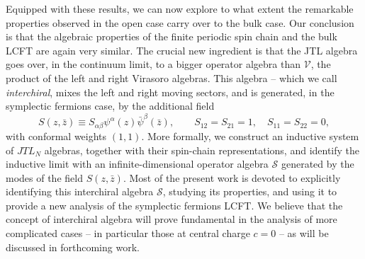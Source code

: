 \documentclass[11pt]{article}
\newcommand{\JTL}[1]{JTL_{#1}}
\newcommand{\VirN}{\boldsymbol{\mathcal{V}}}
\newcommand{\interchalg}{\mathcal{S}}
\theoremstyle{definition}
\begin{document}
Equipped with these results, we can now explore to what extent the remarkable properties observed in the open case \cite{ReadSaleur07-1} carry over to the bulk case. Our conclusion is that the algebraic properties of the finite periodic spin chain and the bulk LCFT are again very similar. The crucial new ingredient is that the JTL algebra goes over, in the continuum limit,
to a bigger operator algebra than $\VirN$, the product of the left and right Virasoro algebras. This algebra -- which we call \textit{interchiral}, mixes the left and right moving sectors, and is generated, in the symplectic fermions case, by the additional field
\begin{equation}\label{eq:interch-f}
S(z,\bar{z})\equiv S_{\alpha\beta}\psi^\alpha(z)\bar{\psi}^\beta(\bar{z}), \qquad S_{12} = S_{21}=1, \quad S_{11} = S_{22}=0,
\end{equation}
 with conformal weights $(1,1)$. More formally, we construct an inductive system of $\JTL{N}$ algebras,
together with their spin-chain representations, and identify the inductive limit with an infinite-dimensional
operator algebra $\interchalg$ generated by the modes of the field $S(z,\bar{z})$. Most of the present work is devoted to explicitly identifying this interchiral algebra $\interchalg$, studying its properties, and  using it to provide a new analysis of   the symplectic fermions LCFT. We believe that the concept of interchiral algebra will prove fundamental in the analysis of more complicated cases -- in particular those at central charge $c=0$ -- as will be discussed in forthcoming work.

\medskip
\end{document}
